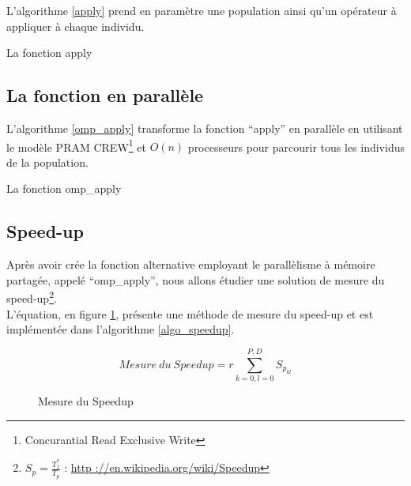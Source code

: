 L'algorithme \ref{apply} prend en paramètre une population ainsi qu'un opérateur à appliquer à chaque individu.

\incmargin{1em}
\begin{algorithm}[here]
  \dontprintsemicolon
  \caption{La fonction apply}
  \label{apply}
\end{algorithm}
\decmargin{1em}

\subsection{La fonction en parallèle}

L'algorithme \ref{omp_apply} transforme la fonction ``apply'' en parallèle en utilisant le modèle PRAM CREW\footnote{Concurantial Read Exclusive Write} et $O(n)$ processeurs pour parcourir tous les individus de la population.

\incmargin{1em}
\begin{algorithm}[here]
  \dontprintsemicolon
  \caption{La fonction omp\_apply}
  \label{omp_apply}
\end{algorithm}
\decmargin{1em}

\subsection{Speed-up}

Après avoir crée la fonction alternative employant le parallèlisme à mémoire partagée, appelé ``omp\_apply'', nous allons étudier une solution de mesure du speed-up\footnote{$S_p = \frac{T_1^*}{T_p}$ : \url{http ://en.wikipedia.org/wiki/Speedup}}.\\

L'équation, en figure \ref{fig:mesure_speedup}, présente une méthode de mesure du speed-up et est implémentée dans l'algorithme \ref{algo_speedup}.

\begin{figure}[here]
\centering
$$Mesure\ du\ Speedup = r \sum^{P,D}_{k=0,l=0} S_{p_{kl}}$$
\caption{Mesure du Speedup}
\label{fig:mesure_speedup}
\end{figure}

